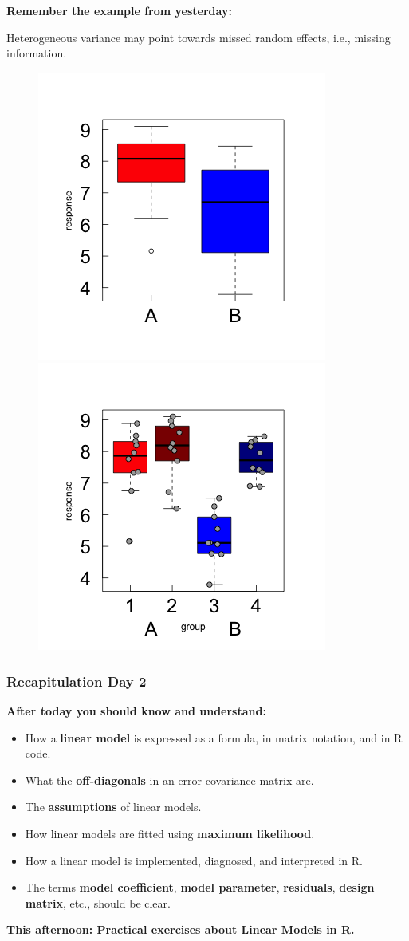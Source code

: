 \documentclass{beamer}
\begin{document}
\begin{frame}
    \frametitle{}
    \textbf{Remember the example from yesterday:}
    
    Heterogeneous variance may point towards missed random effects, i.e., missing information.

    \begin{figure}
        \centering
        \includegraphics[width=0.4\linewidth]{lectures/day_2_LM_refresh_I/figures/unnamed-chunk-43-1.png}
        \includegraphics[width=0.4\linewidth]{lectures/day_2_LM_refresh_I/figures/unnamed-chunk-44-1.png}
    \end{figure}
\end{frame}

\begin{frame}
    \frametitle{Recapitulation Day 2}
    \textbf{After today you should know and understand:}
    \begin{itemize}
        \item How a \textbf{linear model} is expressed as a formula, in matrix notation, and in R code.
        \item What the \textbf{off-diagonals} in an error covariance matrix are.
        \item The \textbf{assumptions} of linear models.
        \item How linear models are fitted using \textbf{maximum likelihood}.
        \item How a linear model is implemented, diagnosed, and interpreted in R.
        \item The terms \textbf{model coefficient}, \textbf{model parameter}, \textbf{residuals}, \textbf{design matrix}, etc., should be clear.
    \end{itemize}
    \vspace{1cm}
    \textbf{This afternoon: Practical exercises about Linear Models in R.}
\end{frame}
\end{document}
